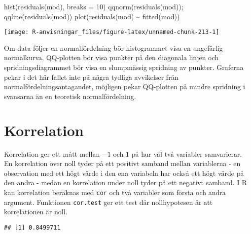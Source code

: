 \documentclass[
]{book}
\newenvironment{Shaded}{\begin{snugshade}}{\end{snugshade}}
\newcommand{\AttributeTok}[1]{\textcolor[rgb]{0.77,0.63,0.00}{#1}}
\newcommand{\DecValTok}[1]{\textcolor[rgb]{0.00,0.00,0.81}{#1}}
\newcommand{\FunctionTok}[1]{\textcolor[rgb]{0.00,0.00,0.00}{#1}}
\newcommand{\NormalTok}[1]{#1}
\newcommand{\SpecialCharTok}[1]{\textcolor[rgb]{0.00,0.00,0.00}{#1}}
\theoremstyle{definition}
\theoremstyle{definition}
\theoremstyle{definition}
\theoremstyle{definition}
\theoremstyle{remark}
\begin{document}
\begin{Shaded}
\begin{Highlighting}[]
\FunctionTok{hist}\NormalTok{(}\FunctionTok{residuals}\NormalTok{(mod), }\AttributeTok{breaks =} \DecValTok{10}\NormalTok{)}
\FunctionTok{qqnorm}\NormalTok{(}\FunctionTok{residuals}\NormalTok{(mod)); }\FunctionTok{qqline}\NormalTok{(}\FunctionTok{residuals}\NormalTok{(mod))}
\FunctionTok{plot}\NormalTok{(}\FunctionTok{residuals}\NormalTok{(mod) }\SpecialCharTok{\textasciitilde{}} \FunctionTok{fitted}\NormalTok{(mod))}
\end{Highlighting}
\end{Shaded}

\begin{center}\texttt{[image: R-anvisningar\_files/figure-latex/unnamed-chunk-213-1]} \end{center}

Om data följer en normalfördelning bör histogrammet visa en ungefärlig normalkurva, QQ-plotten bör visa punkter på den diagonala linjen och spridningsdiagrammet bör visa en slumpmässig spridning av punkter. Graferna pekar i det här fallet inte på några tydliga avvikelser från normalfördelningsantagandet, möjligen pekar QQ-plotten på mindre spridning i svansarna än en teoretisk normalfördelning.

\hypertarget{korrelation}{%
\section{Korrelation}\label{korrelation}}

Korrelation ger ett mått mellan \(-1\) och \(1\) på hur väl två variabler samvarierar. En korrelation över noll tyder på ett positivt samband mellan variablerna - en observation med ett högt värde i den ena variabeln har också ett högt värde på den andra - medan en korrelation under noll tyder på ett negativt samband. I R kan korrelation beräknas med \texttt{cor} och två variabler som första och andra argument. Funktionen \texttt{cor.test} ger ett test där nollhypotesen är att korrelationen är noll.

\begin{Shaded}
\end{Shaded}

\begin{verbatim}
## [1] 0.8499711
\end{verbatim}
\end{document}
